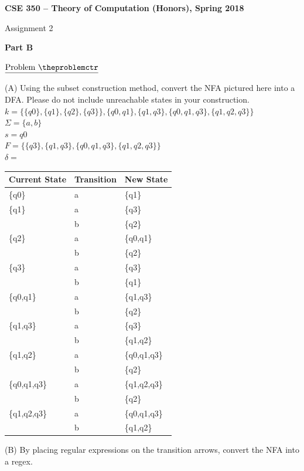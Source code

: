 \documentclass[11pt]{article}
\def\pp{\par\noindent}
\begin{document}
\centerline{\bf CSE 350 -- Theory of Computation (Honors), Spring 2018}
\medskip
\centerline{Assignment 2}
\bigskip
\centerline{\bf Part B}


\addtocounter{problemctr}{1}
\addtocounter{problemctr}{1}
\addtocounter{problemctr}{1}
\bigskip
\addtocounter{problemctr}{1}
\noindent $\underline{\rm Problem\ \theproblemctr}$\pp

\noindent (A) Using the subset construction method, convert the NFA pictured here
into a DFA. Please do not include unreachable states in your construction.\\
$k=\{\{q0\},\{q1\},\{q2\},\{q3\}\},\{q0,q1\},\{q1,q3\},\{q0,q1,q3\},\{q1,q2,q3\}\}$\\
$\Sigma=\{a,b\}$\\
$s=q0$\\
$F=\{\{q3\},\{q1,q3\},\{q0,q1,q3\},\{q1,q2,q3\}\}$\\
$\delta=$\\
\begin{tabular}{|l|l|l|}
  \hline
  \textbf{Current State} & \textbf{Transition} & \textbf{New State}\\
  \hline
  \{q0\} & a & \{q1\} \\
  \hline
  \{q1\} & a & \{q3\} \\
  \hline
  & b & \{q2\} \\
  \hline
  \{q2\} & a & \{q0,q1\} \\
  \hline
  & b & \{q2\} \\
  \hline
  \{q3\} & a & \{q3\} \\
  \hline
  & b & \{q1\} \\
  \hline
  \{q0,q1\} & a & \{q1,q3\}\\ 
  \hline
  & b & \{q2\}\\
  \hline
  \{q1,q3\} & a & \{q3\}\\ 
  \hline
  & b & \{q1,q2\}\\ 
  \hline
  \{q1,q2\} & a & \{q0,q1,q3\}\\ 
  \hline
  & b & \{q2\}\\ 
  \hline
  \{q0,q1,q3\} & a & \{q1,q2,q3\}\\ 
  \hline
  & b & \{q2\}\\ 
  \hline
  \{q1,q2,q3\} & a & \{q0,q1,q3\}\\ 
  \hline
  & b & \{q1,q2\}\\ 
  \hline
\end{tabular}

\noindent (B) By placing regular expressions on the transition arrows, convert
the NFA into a regex.
\end{document}
